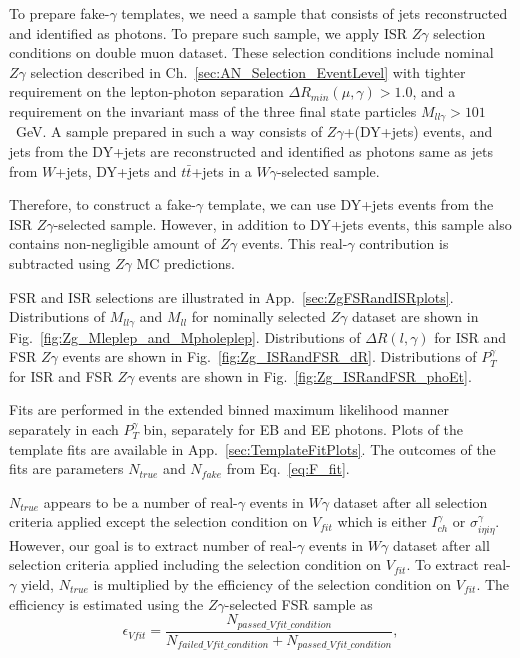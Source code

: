 To prepare fake-$\gamma$ templates, we need a sample that consists of jets reconstructed and identified as photons. To prepare such sample, we apply ISR $Z\gamma$ selection conditions on double muon dataset. These selection conditions include nominal $Z\gamma$ selection described in Ch.~\ref{sec:AN_Selection_EventLevel} with tighter requirement on the lepton-photon separation $\Delta{R_{min}}(\mu,\gamma)>1.0$, and a requirement on the invariant mass of the three final state particles $M_{ll\gamma}>101$~GeV. A sample prepared in such a way consists of $Z\gamma$+(DY+jets) events, and jets from the DY+jets are reconstructed and identified as photons same as jets from $W$+jets, DY+jets and $t\bar{t}$+jets in a $W\gamma$-selected sample. 

Therefore, to construct a fake-$\gamma$ template, we can use DY+jets events from the ISR $Z\gamma$-selected sample. However, in addition to DY+jets events, this sample also contains non-negligible amount of $Z\gamma$ events. This real-$\gamma$ contribution is subtracted using $Z\gamma$ MC predictions.

FSR and ISR selections are illustrated in App.~\ref{sec:ZgFSRandISRplots}. Distributions of $M_{ll\gamma}$ and $M_{ll}$ for nominally selected $Z\gamma$ dataset are shown in Fig.~\ref{fig:Zg_Mleplep_and_Mpholeplep}. Distributions of $\Delta{R}(l,\gamma)$ for ISR and FSR $Z\gamma$ events are shown in Fig.~\ref{fig:Zg_ISRandFSR_dR}. Distributions of $P_{T}^{\gamma}$ for ISR and FSR $Z\gamma$ events are shown in Fig.~\ref{fig:Zg_ISRandFSR_phoEt}. 

Fits are performed in the extended binned maximum likelihood manner separately in each $P_T^{\gamma}$ bin, separately for EB and EE photons. Plots of the template fits are available in App.~\ref{sec:TemplateFitPlots}. The outcomes of the fits are parameters $N_{true}$ and $N_{fake}$ from Eq.~\ref{eq:F_fit}.

$N_{true}$ appears to be a number of real-$\gamma$ events in $W\gamma$ dataset after all selection criteria applied except the selection condition on $V_{fit}$ which is either $I_{ch}^{\gamma}$ or $\sigma_{i\eta i\eta}^{\gamma}$. However, our goal is to extract number of real-$\gamma$ events in $W\gamma$ dataset after all selection criteria applied including the selection condition on $V_{fit}$. To extract real-$\gamma$ yield, $N_{true}$ is multiplied by the efficiency of the selection condition on $V_{fit}$. The efficiency is estimated using the $Z\gamma$-selected FSR sample as 
\begin{equation}
 \epsilon_{Vfit} = \frac{N_{passed\_Vfit\_condition}}{N_{failed\_Vfit\_condition}+N_{passed\_Vfit\_condition}},
\end{equation}

